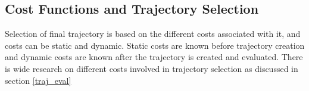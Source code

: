 








\subsection{Cost Functions and Trajectory Selection} \label{traj_Selection}
Selection of final trajectory is based on the different costs associated with it, and costs can be static and dynamic. Static costs are known before trajectory creation and dynamic costs are known after the trajectory is created and evaluated. There is wide research on different costs involved in trajectory selection as discussed in section \ref{traj_eval}

